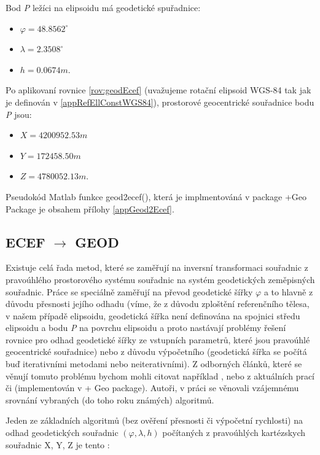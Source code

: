 \documentclass[11pt,a4paper]{article}
\begin{document}
Bod \textit{P} ležíci na elipsoidu má geodetické spuřadnice:
\begin{itemize}
\item $\varphi = 48.8562^{\circ}$
\item $\lambda = 2.3508^{\circ}$
\item $h = 0.0674 m.$
\end{itemize}
Po aplikovaní rovnice \ref{rov:geodEcef} (uvažujeme rotační elipsoid WGS-84 tak jak je definován v \ref{appRefEllConstWGS84}), prostorové geocentrické souřadnice bodu \textit{P} jsou:
\begin{itemize}
\item $X = 4200952.53 m$
\item $Y = 172458.50 m$
\item $Z = 4780052.13 m.$
\end{itemize}

Pseudokód Matlab funkce geod2ecef(), která je implmentováná v package +Geo Package je obsahem přílohy \ref{appGeod2Ecef}.


\subsection{ECEF $\rightarrow$ GEOD}

Existuje celá řada metod, které se zaměřují na inversní transformaci souřadnic z pravoúhlého prostorového systému souřadnic na systém geodetických zeměpisných souřadnic. Práce se speciálně zaměřují na převod geodetické šířky $\varphi$ a to hlavně z důvodu přesnosti jejího odhadu (víme, že z důvodu zploštění referenčního tělesa, v našem případě elipsoidu, geodetická šířka není definována na spojnici středu elipsoidu a bodu \textit{P} na povrchu elipsoidu a proto nastávají problémy řešení rovnice pro odhad geodetické šířky ze vstupních parametrů, které jsou pravoúhlé geocentrické souřadnice) nebo z důvodu výpočetního (geodetická šířka se počítá buď iterativními metodami nebo neiterativními). Z odborných článků, které se věnují tomuto problému bychom mohli citovat například \cite{Bowring1976}, \cite{Borkowski1989} nebo z aktuálních prací \cite{Fukushima2006} či \cite{Vermeille2011} (implementován v + Geo package). Autoři, v práci \cite{Fok2003} se věnovali vzájemnému srovnání vybraných (do toho roku známých) algoritmů.

Jeden ze základních algoritmů (bez ověření přesnosti či výpočetní rychlosti) na odhad geodetických souřadnic $ \left(\varphi, \lambda, h \right)$ počítaných z pravoúhlých kartézskych souřadnic X, Y, Z je tento \cite{Grewal2001}:
\end{document}
